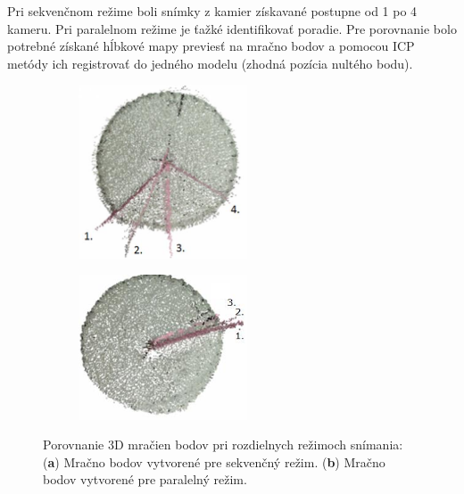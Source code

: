 Pri sekvenčnom režime boli snímky z kamier získavané postupne od 1 po 4 kameru. Pri paralelnom režime je ťažké identifikovať poradie. Pre porovnanie bolo potrebné získané hĺbkové mapy previesť na mračno bodov a pomocou ICP metódy ich registrovať do jedného modelu (zhodná pozícia nultého bodu). 

\begin{figure}[h]
	\centering
	\begin{subfigure}[b]{0.44\textwidth}
		\centering
		\includegraphics[width=5cm]{figures/dynamic_result_seq.png}
		\caption{}
		\label{fig:dynamic:a}
	\end{subfigure}
	\hskip 8pt 
	\begin{subfigure}[b]{0.44\textwidth}
		\centering
		\includegraphics[width=5cm]{figures/dynamic_result_par.png}
		\caption{}
		\label{fig:dynamic:b}
	\end{subfigure}
	\caption{Porovnanie 3D mračien bodov pri rozdielnych režimoch snímania: (\textbf{a}) Mračno bodov vytvorené pre sekvenčný režim. (\textbf{b}) Mračno bodov vytvorené pre paralelný režim.}
	\label{fig:dynamic}
\end{figure}


